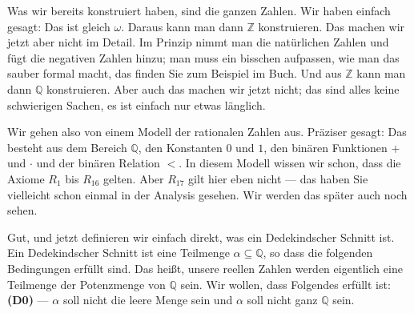 \begin{ai-global-state-checkpoint-invisible-content}
\end{ai-global-state-checkpoint-invisible-content}

\begin{spoken-clean}[00:22:30 - 00:24:50]
Was wir bereits konstruiert haben, sind die ganzen Zahlen. Wir haben einfach gesagt: Das ist gleich $\omega$. Daraus kann man dann $\mathbb{Z}$ konstruieren. Das machen wir jetzt aber nicht im Detail. Im Prinzip nimmt man die natürlichen Zahlen und fügt die negativen Zahlen hinzu; man muss ein bisschen aufpassen, wie man das sauber formal macht, das finden Sie zum Beispiel im Buch. Und aus $\mathbb{Z}$ kann man dann $\mathbb{Q}$ konstruieren. Aber auch das machen wir jetzt nicht; das sind alles keine schwierigen Sachen, es ist einfach nur etwas länglich.

Wir gehen also von einem Modell der rationalen Zahlen aus. Präziser gesagt: Das besteht aus dem Bereich $\mathbb{Q}$, den Konstanten $0$ und $1$, den binären Funktionen $+$ und $\cdot$ und der binären Relation $<$. In diesem Modell wissen wir schon, dass die Axiome $R_1$ bis $R_{16}$ gelten. Aber $R_{17}$ gilt hier eben nicht --- das haben Sie vielleicht schon einmal in der Analysis gesehen. Wir werden das später auch noch sehen.

Gut, und jetzt definieren wir einfach direkt, was ein Dedekindscher Schnitt ist. Ein Dedekindscher Schnitt ist eine Teilmenge $\alpha \subseteq \mathbb{Q}$, so dass die folgenden Bedingungen erfüllt sind. Das heißt, unsere reellen Zahlen werden eigentlich eine Teilmenge der Potenzmenge von $\mathbb{Q}$ sein. Wir wollen, dass Folgendes erfüllt ist: \textbf{(D0)} --- $\alpha$ soll nicht die leere Menge sein und $\alpha$ soll nicht ganz $\mathbb{Q}$ sein.
\end{spoken-clean}

